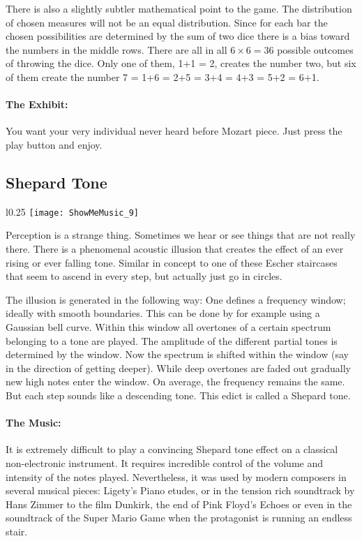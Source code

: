 There is also a slightly subtler mathematical point to the game. The distribution of chosen measures will not be an equal distribution. Since for each bar the chosen possibilities are determined by the sum of two dice there is a bias toward the numbers in the middle rows. There are all in all $6\times 6=36$ possible outcomes of throwing the dice. Only one of them, 1+1 = 2, creates the number two, but six of them create the number 7 = 1+6 = 2+5 = 3+4 = 4+3 = 5+2 = 6+1.

\paragraph{The Exhibit:} You want your very individual never heard before Mozart piece. Just press the play button and enjoy.

\subsection{Shepard Tone}

\begin{wrapfigure}[39]{l}{0.25\textwidth}
\centering
\texttt{[image: ShowMeMusic\_9]}
\end{wrapfigure}
Perception is a strange thing. Sometimes we hear or see things that are not really there. There is a phenomenal acoustic illusion that creates the effect of an ever rising or ever falling tone. Similar in concept to one of these Escher staircases that seem to ascend in every step, but actually just go in circles.

The illusion is generated in the following way: One defines a frequency window; ideally with smooth boundaries. This can be done by for example using a Gaussian bell curve. Within this window all overtones of a certain spectrum belonging to a tone are played. The amplitude of the different partial tones is determined by the window. Now the spectrum is shifted within the window (say in the direction of getting deeper). While deep overtones are faded out gradually new high notes enter the window. On average, the frequency remains the same. But each step sounds like a descending tone. This edict is called a Shepard tone.



\paragraph{The Music:} It is extremely difficult to play a convincing Shepard tone effect on a classical non-electronic instrument. It requires incredible control of the volume and intensity of the notes played. Nevertheless, it was used by modern composers in several musical pieces: Ligety's Piano etudes, or in the tension rich soundtrack by Hans Zimmer to the film Dunkirk, the end of Pink Floyd's Echoes or even in the soundtrack of the Super Mario Game when the protagonist is running an endless stair.

